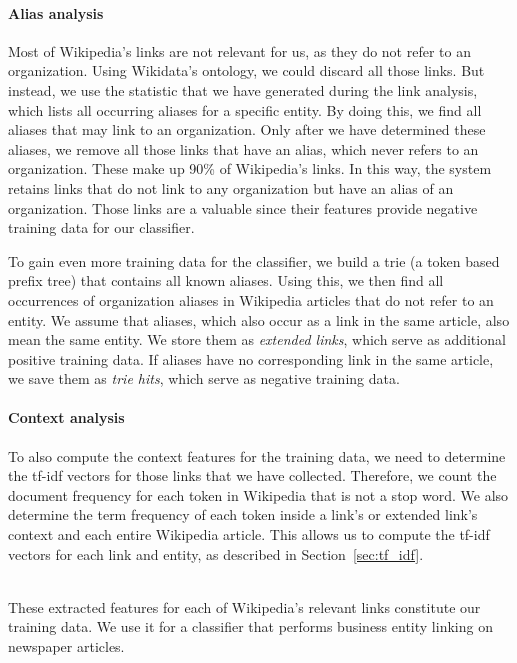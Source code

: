 \paragraph{Alias analysis}
\label{sec:alias_analysis}
Most of Wikipedia's links are not relevant for us, as they do not refer to an organization. Using Wikidata's ontology, we could discard all those links. But instead, we use the statistic that we have generated during the link analysis, which lists all occurring aliases for a specific entity. By doing this, we find all aliases that may link to an organization. Only after we have determined these aliases, we remove all those links that have an alias, which never refers to an organization. These make up 90\% of Wikipedia's links. In this way, the system retains links that do not link to any organization but have an alias of an organization. Those links are a valuable since their features provide negative training data for our classifier.

To gain even more training data for the classifier, we build a trie (a token based prefix tree) that contains all known aliases. Using this, we then find all occurrences of organization aliases in Wikipedia articles that do not refer to an entity. We assume that aliases, which also occur as a link in the same article, also mean the same entity. We store them as \textit{extended links}, which serve as additional positive training data. If aliases have no corresponding link in the same article, we save them as \textit{trie hits}, which serve as negative training data.


\paragraph{Context analysis}
To also compute the context features for the training data, we need to determine the tf-idf vectors for those links that we have collected. Therefore, we count the document frequency for each token in Wikipedia that is not a stop word. We also determine the term frequency of each token inside a link's or extended link's context and each entire Wikipedia article. This allows us to compute the tf-idf vectors for each link and entity, as described in Section~\ref{sec:tf_idf}.

~\\

These extracted features for each of Wikipedia's relevant links constitute our training data. We use it for a classifier that performs business entity linking on newspaper articles.

